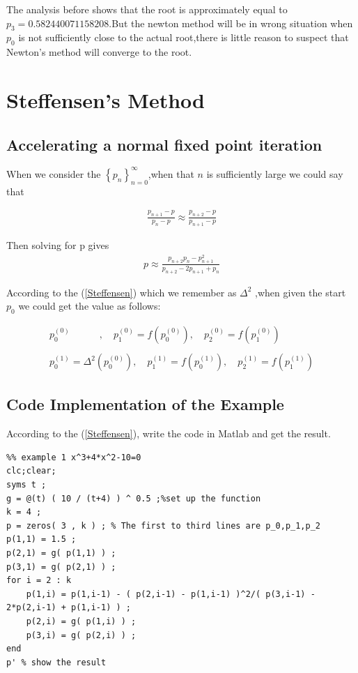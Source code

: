 \documentclass{article}
\begin{document}
The analysis before shows that the root is approximately equal to $p_3=0.582440071158208$.But the newton method will be in wrong situation when $p_0$ is not sufficiently close to the actual root,there is little reason to suspect that Newton's method will converge to the root.



\section{Steffensen's Method}
\subsection{Accelerating a normal fixed point iteration}
When we consider the $\left\{ p_n \right\}_{n=0}^{\infty}$,when that $n$ is sufficiently large\cite{ref1} we could say that

\begin{align}
\frac{p_{n+1}-p}{p_n-p}\approx \frac{p_{n+2}-p}{p_{n+1}-p} \nonumber
\end{align}

Then solving for p gives
\begin{align}
p\approx \frac{p_{n+2}p_n-p^2_{n+1}}{p_{n+2}-2p_{n+1}+p_n}
\label{Steffensen}
\end{align}

According to the (\ref{Steffensen}) which we remember as $\Delta^2$ ,when given the start $p_0$ we could get the value as follows:

\begin{align}
p^{(0)}_{0}\quad\quad\quad, \quad p^{(0)}_{1} = f(p^{(0)}_{0}), \quad p^{(0)}_{2} = f(p^{(0)}_{1})\nonumber\\
\nonumber\\
p^{(1)}_{0} = \Delta^2(p^{(0)}_{0}), \quad p^{(1)}_{1} = f(p^{(1)}_{0}), \quad p^{(1)}_{2} = f(p^{(1)}_{1})\nonumber
\end{align}

\subsection{Code Implementation of the Example}

According to the (\ref{Steffensen}), write the code in Matlab and get the result.

\begin{lstlisting}
%% example 1 x^3+4*x^2-10=0
clc;clear;
syms t ;
g = @(t) ( 10 / (t+4) ) ^ 0.5 ;%set up the function
k = 4 ;
p = zeros( 3 , k ) ; % The first to third lines are p_0,p_1,p_2
p(1,1) = 1.5 ;
p(2,1) = g( p(1,1) ) ;
p(3,1) = g( p(2,1) ) ;
for i = 2 : k
    p(1,i) = p(1,i-1) - ( p(2,i-1) - p(1,i-1) )^2/( p(3,i-1) - 2*p(2,i-1) + p(1,i-1) ) ;
    p(2,i) = g( p(1,i) ) ;
    p(3,i) = g( p(2,i) ) ;
end
p' % show the result
\end{lstlisting}
\end{document}
